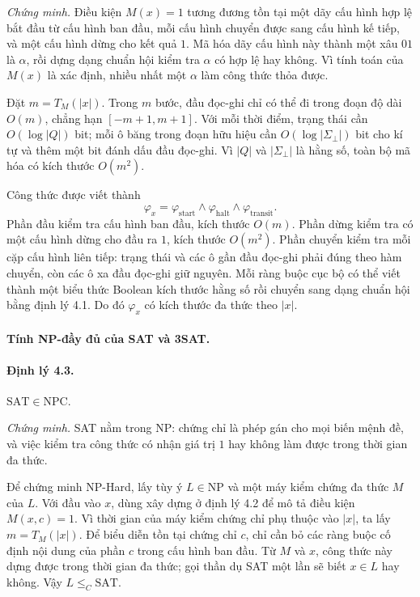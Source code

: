 \documentclass[11pt]{article}
\begin{document}
\emph{Chứng minh.}
Điều kiện \(M(x)=1\) tương đương tồn tại một dãy cấu hình hợp lệ bắt đầu từ cấu
hình ban đầu, mỗi cấu hình chuyển được sang cấu hình kế tiếp, và một cấu hình
dừng cho kết quả \(1\). Mã hóa dãy cấu hình này thành một xâu \(01\) là
\(\alpha\), rồi dựng dạng chuẩn hội kiểm tra \(\alpha\) có hợp lệ hay không.
Vì tính toán của \(M(x)\) là xác định, nhiều nhất một \(\alpha\) làm công thức
thỏa được.

Đặt \(m=T_M(|x|)\). Trong \(m\) bước, đầu đọc-ghi chỉ có thể đi trong đoạn độ
dài \(O(m)\), chẳng hạn \([-m+1,m+1]\). Với mỗi thời điểm, trạng thái cần
\(O(\log|Q|)\) bit; mỗi ô băng trong đoạn hữu hiệu cần \(O(\log|\Sigma_{\bot}|)\)
bit cho kí tự và thêm một bit đánh dấu đầu đọc-ghi. Vì \(|Q|\) và
\(|\Sigma_{\bot}|\) là hằng số, toàn bộ mã hóa có kích thước \(O(m^2)\).

Công thức được viết thành
\[
  \varphi_x=\varphi_{\mathrm{start}}\land
  \varphi_{\mathrm{halt}}\land
  \varphi_{\mathrm{transit}}.
\]
Phần đầu kiểm tra cấu hình ban đầu, kích thước \(O(m)\). Phần dừng kiểm tra có
một cấu hình dừng cho đầu ra \(1\), kích thước \(O(m^2)\). Phần chuyển kiểm tra
mỗi cặp cấu hình liên tiếp: trạng thái và các ô gần đầu đọc-ghi phải đúng theo
hàm chuyển, còn các ô xa đầu đọc-ghi giữ nguyên. Mỗi ràng buộc cục bộ có thể
viết thành một biểu thức Boolean kích thước hằng số rồi chuyển sang dạng chuẩn
hội bằng định lý 4.1. Do đó \(\varphi_x\) có kích thước đa thức theo \(|x|\).

\paragraph{Tính NP-đầy đủ của SAT và 3SAT.}

\paragraph{Định lý 4.3.}
\(\mathrm{SAT}\in\mathrm{NPC}\).

\emph{Chứng minh.}
SAT nằm trong NP: chứng chỉ là phép gán cho mọi biến mệnh đề, và việc kiểm tra
công thức có nhận giá trị \(1\) hay không làm được trong thời gian đa thức.

Để chứng minh NP-Hard, lấy tùy ý \(L\in\mathrm{NP}\) và một máy kiểm chứng đa
thức \(M\) của \(L\). Với đầu vào \(x\), dùng xây dựng ở định lý 4.2 để mô tả
điều kiện \(M(x,c)=1\). Vì thời gian của máy kiểm chứng chỉ phụ thuộc vào
\(|x|\), ta lấy \(m=T_M(|x|)\). Để biểu diễn tồn tại chứng chỉ \(c\), chỉ cần
bỏ các ràng buộc cố định nội dung của phần \(c\) trong cấu hình ban đầu. Từ
\(M\) và \(x\), công thức này dựng được trong thời gian đa thức; gọi thần dụ SAT
một lần sẽ biết \(x\in L\) hay không. Vậy \(L\le_C\mathrm{SAT}\).
\end{document}
